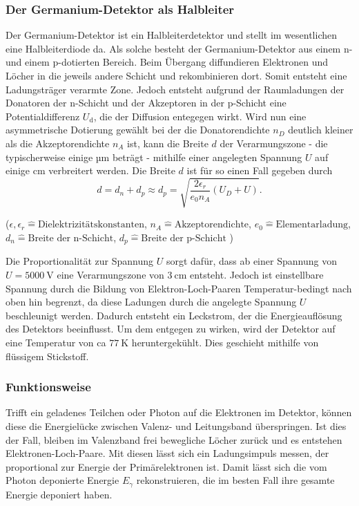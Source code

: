 \subsubsection{Der Germanium-Detektor als Halbleiter}
Der Germanium-Detektor ist ein Halbleiterdetektor und stellt im wesentlichen eine Halbleiterdiode da. Als solche besteht der Germanium-Detektor aus einem n- und einem p-dotierten Bereich. Beim Übergang diffundieren Elektronen und Löcher in die jeweils andere Schicht und rekombinieren dort. Somit entsteht eine Ladungsträger verarmte Zone. Jedoch entsteht aufgrund der Raumladungen der Donatoren der n-Schicht und der Akzeptoren in der p-Schicht eine Potentialdifferenz $U_\text{d}$, die der Diffusion entegegen wirkt. Wird nun eine asymmetrische Dotierung gewählt bei der die Donatorendichte $n_D$ deutlich kleiner als die Akzeptorendichte $n_A$ ist, kann die Breite $d$ der Verarmungszone - die typischerweise einige µm beträgt - mithilfe einer angelegten Spannung $U$ auf einige cm verbreitert werden. Die Breite $d$ ist für so einen Fall gegeben durch
\begin{equation}
 d = d_n + d_p \approx d_p = \sqrt{\frac{2 \epsilon_r }{e_0 n_A}(U_D + U)}.
\end{equation}
\begin{center}
\tiny{($ \epsilon, \epsilon_r \hat{=} \text{Dielektrizitätskonstanten} $, $ n_A \hat{=} \text{Akzeptorendichte} $, $e_0 \hat{=} \text{Elementarladung} $, $d_n \hat{=} \text{Breite der n-Schicht}$, $d_p \hat{=} \text{Breite der p-Schicht}$ )}
\end{center}
Die Proportionalität zur Spannung $U$ sorgt dafür, dass ab einer Spannung von $U = \SI{5000}{\volt}$ eine Verarmungszone von  $\SI{3}{\centi \meter}$ entsteht. Jedoch ist einstellbare Spannung durch die Bildung von Elektron-Loch-Paaren Temperatur-bedingt nach oben hin begrenzt, da diese Ladungen durch die angelegte Spannung $U$ beschleunigt werden. Dadurch entsteht ein Leckstrom, der die Energieauflösung des Detektors beeinflusst. Um dem entgegen zu wirken, wird der Detektor auf eine Temperatur von ca $\SI{77}{\kelvin}$ heruntergekühlt. Dies geschieht mithilfe von flüssigem Stickstoff. \\

\subsubsection{Funktionsweise}
Trifft ein geladenes Teilchen oder Photon auf die Elektronen im Detektor, können diese die Energielücke zwischen Valenz- und Leitungsband überspringen. Ist dies der Fall, bleiben im Valenzband frei bewegliche Löcher zurück und es entstehen Elektronen-Loch-Paare. Mit diesen lässt sich ein Ladungsimpuls messen, der proportional zur Energie der Primärelektronen ist. Damit lässt sich die vom Photon deponierte Energie $E_\gamma$ rekonstruieren, die im besten Fall ihre gesamte Energie deponiert haben.

